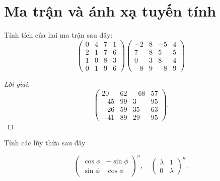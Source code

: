 \chapter{Ma trận và ánh xạ tuyến tính}

\begin{exercise}
    Tính tích của hai ma trận sau đây:
    \[
        \begin{pmatrix}
            0 & 4 & 7 & 1 \\
            2 & 1 & 7 & 6 \\
            1 & 0 & 8 & 3 \\
            0 & 1 & 9 & 6
        \end{pmatrix}
        \begin{pmatrix}
            -2 & 8 & -5 & 4 \\
            7  & 8 & 5  & 5 \\
            0  & 3 & 8  & 4 \\
            -8 & 9 & -8 & 9
        \end{pmatrix}
    \]
\end{exercise}

\begin{proof}[Lời giải]
    \[
        \begin{pmatrix}
            20  & 62 & -68 & 57 \\
            -45 & 99 & 3   & 95 \\
            -26 & 59 & 35  & 63 \\
            -41 & 89 & 29  & 95
        \end{pmatrix}.
    \]
\end{proof}

\par Tính các lũy thừa sau đây

\begin{exercise}
    \[
        {\begin{pmatrix}
            \cos\phi & -\sin\phi \\
            \sin\phi & \cos\phi
        \end{pmatrix}}^{n},\quad
        {\begin{pmatrix}
            \lambda & 1       \\
            0       & \lambda
        \end{pmatrix}}^{n}.
    \]
\end{exercise}

